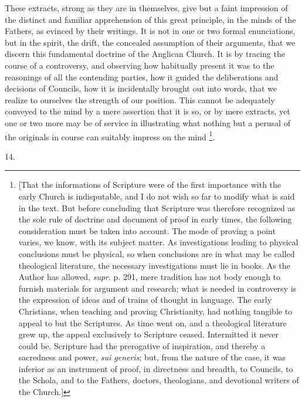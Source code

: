 These extracts, strong as they are in themselves, give but a faint
impression of the distinct and familiar apprehension of this great
principle, in the minds of the Fathers, as evinced by their writings.
It is not in one or two formal enunciations, but in the spirit, the
drift, the concealed assumption of their arguments, that we discern
this fundamental doctrine of the Anglican Church. It is by tracing the
course of a controversy, and observing how habitually present it was
to the reasonings of all the contending parties, how it guided the
deliberations and decisions of Councils, how it is incidentally
brought out into words, that we realize to ourselves the strength of
our position. This cannot be adequately conveyed to the mind by a mere
assertion that it is so, or by mere extracts, yet one or two more may
be of service in illustrating what nothing but a perusal of the
originals in course can suitably impress on the mind \footnote{[That the informations of Scripture were of the first
importance with the early Church is indisputable, and I do not wish so
far to modify what is said in the text. But before concluding that
Scripture was therefore recognized as the sole rule of doctrine and
document of proof in early times, the following consideration must be
taken into account. The mode of proving a point varies, we know, with
its subject matter. As investigations leading to physical conclusions
must be physical, so when conclusions are in what may be called
theological literature, the necessary investigations must lie in
books. As the Author has allowed, \emph{supr}. p. 291, mere tradition
has not body enough to furnish materials for argument and research;
what is needed in controversy is the expression of ideas and of trains
of thought in language. The early Christians, when teaching and
proving Christianity, had nothing tangible to appeal to but the
Scriptures. As time went on, and a theological literature grew up, the
appeal exclusively to Scripture ceased. Intermitted it never could be.
Scripture had the prerogative of inspiration, and thereby a sacredness
and power, \emph{sui generis}; but, from the nature of the case, it
was inferior as an instrument of proof, in directness and breadth, to
Councils, to the Schola, and to the Fathers, doctors, theologians, and
devotional writers of the Church.]}.

14.

